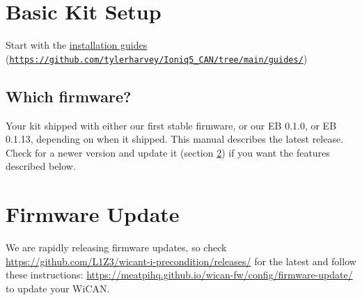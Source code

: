 \documentclass[superscriptaddress,onecolumn,floatfix]{revtex4-2}
\begin{document}
\section{Basic Kit Setup}
Start with the \href{https://github.com/tylerharvey/Ioniq5_CAN/tree/main/guides/}{installation guides} (\href{https://github.com/tylerharvey/Ioniq5_CAN/tree/main/guides/}{\nolinkurl{https://github.com/tylerharvey/Ioniq5_CAN/tree/main/guides/}})

\subsection{Which firmware?}
Your kit shipped with either our first stable firmware, or our EB 0.1.0, or EB 0.1.13, depending on when it shipped. This manual describes the latest release. Check for a newer version and update it (section \ref{sect:firmware}) if you want the features described below.

\section{Firmware Update} \label{sect:firmware}

We are rapidly releasing firmware updates, so check \href{https://github.com/L1Z3/wicant-i-precondition/releases/}{https://github.com/L1Z3/wicant-i-precondition/releases/} for the latest and follow these instructions: \href{https://meatpihq.github.io/wican-fw/config/firmware-update/}{https://meatpihq.github.io/wican-fw/config/firmware-update/} to update your WiCAN.
\end{document}
